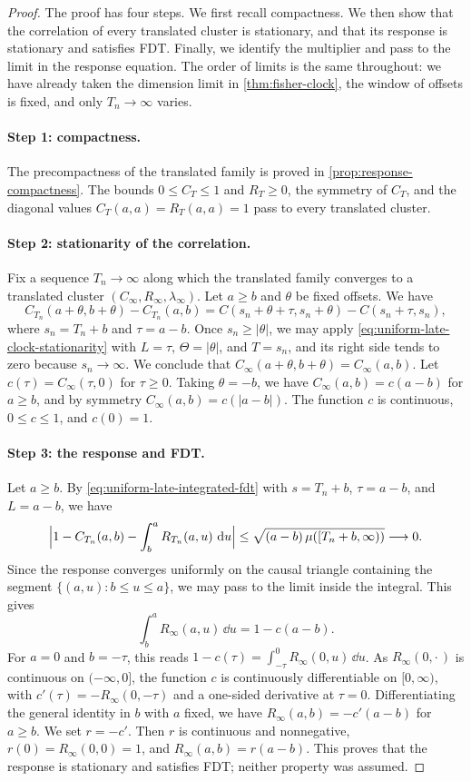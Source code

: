 \begin{proof}
The proof has four steps. We first recall compactness. We then show that the correlation of every translated cluster is stationary, and that its response is stationary and satisfies FDT. Finally, we identify the multiplier and pass to the limit in the response equation. The order of limits is the same throughout: we have already taken the dimension limit in \cref{thm:fisher-clock}, the window of offsets is fixed, and only $T_n\to\infty$ varies.

\paragraph{Step 1: compactness.}
The precompactness of the translated family is proved in \cref{prop:response-compactness}. The bounds $0\le C_T\le1$ and $R_T\ge0$, the symmetry of $C_T$, and the diagonal values $C_T(a,a)=R_T(a,a)=1$ pass to every translated cluster.

\paragraph{Step 2: stationarity of the correlation.}
Fix a sequence $T_n\to\infty$ along which the translated family converges to a translated cluster $(C_\infty,R_\infty,\lambda_\infty)$. Let $a\ge b$ and $\theta$ be fixed offsets. We have
\[
 C_{T_n}(a+\theta,b+\theta)-C_{T_n}(a,b)=C(s_n+\theta+\tau,s_n+\theta)-C(s_n+\tau,s_n),
\]
where $s_n=T_n+b$ and $\tau=a-b$.
Once $s_n\ge|\theta|$, we may apply \eqref{eq:uniform-late-clock-stationarity} with $L=\tau$, $\Theta=|\theta|$, and $T=s_n$, and its right side tends to zero because $s_n\to\infty$. We conclude that $C_\infty(a+\theta,b+\theta)=C_\infty(a,b)$. Let $c(\tau)=C_\infty(\tau,0)$ for $\tau\ge0$. Taking $\theta=-b$, we have $C_\infty(a,b)=c(a-b)$ for $a\ge b$, and by symmetry $C_\infty(a,b)=c(|a-b|)$. The function $c$ is continuous, $0\le c\le1$, and $c(0)=1$.

\paragraph{Step 3: the response and FDT.}
Let $a\ge b$. By \eqref{eq:uniform-late-integrated-fdt} with $s=T_n+b$, $\tau=a-b$, and $L=a-b$, we have
\[
 \Bigl|1-C_{T_n}(a,b)-\int_b^aR_{T_n}(a,u)\,\mathop{}\!\mathrm d u\Bigr|\le\sqrt{(a-b)\,\mu([T_n+b,\infty))}\longrightarrow0.
\]
Since the response converges uniformly on the causal triangle containing the segment $\{(a,u):b\le u\le a\}$, we may pass to the limit inside the integral. This gives
\[
 \int_b^aR_\infty(a,u)\,\dd u=1-c(a-b).
\]
For $a=0$ and $b=-\tau$, this reads $1-c(\tau)=\int_{-\tau}^0R_\infty(0,u)\,\dd u$. As $R_\infty(0,\cdot\,)$ is continuous on $(-\infty,0]$, the function $c$ is continuously differentiable on $[0,\infty)$, with $c'(\tau)=-R_\infty(0,-\tau)$ and a one-sided derivative at $\tau=0$. Differentiating the general identity in $b$ with $a$ fixed, we have $R_\infty(a,b)=-c'(a-b)$ for $a\ge b$. We set $r=-c'$. Then $r$ is continuous and nonnegative, $r(0)=R_\infty(0,0)=1$, and $R_\infty(a,b)=r(a-b)$. This proves that the response is stationary and satisfies FDT; neither property was assumed.


\end{proof}
